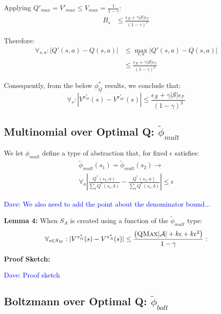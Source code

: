 \documentclass{article}
\newcommand{\ep}{\widetilde \phi}
\newcommand\dnote[1]{\textcolor{blue}{Dave: #1}}
\begin{document}
Applying $Q'_{max}=V'_{max} \leq V_{max}=\frac{1}{1-\gamma}$:
\begin{align*}
B_{s} &\leq 
\frac
{{\epsilon_{\mathcal{R}}} + \gamma |\mathcal{S}|\epsilon_{\mathcal{T}}}
{(1-\gamma)^2}
\end{align*}

Therefore:
\begin{align*}
\forall_{s,a} : |Q'(s,a) - Q(s,a)| &\leq \max_{s,a}|Q'(s,a)-Q(s,a)| \\
&\leq  \frac{{\epsilon_{\mathcal{R}}} + \gamma |\mathcal{S}|\epsilon_{\mathcal{T}} }{(1-\gamma)^2}
\end{align*}

Consequently, from the below $\phi_Q^*$ results, we conclude that:
\begin{equation}
\forall_s : |V^{\pi^*_M}(s) - V^{\pi^*_{M'}}(s)| \leq \frac{{\epsilon_{\mathcal{R}}} + \gamma |\mathcal{S}|\epsilon_{\mathcal{T}}}{(1-\gamma)^3}
\end{equation}


\subsection{Multinomial over Optimal Q: $\ep_{mult}$}

We let $\phi_{mult}$ define a type of abstraction that, for fixed $\epsilon$ satisfies:
\begin{multline}
\ep_{mult}(s_1) = \ep_{mult}(s_2) \rightarrow \\
\forall_{a} \left|\frac{Q^*(s_1,a)}{\sum_b Q^*(s_1,b)} - \frac{Q^*(s_1,a)}{\sum_b Q^*(s_1,b)}\right| \leq \epsilon
\end{multline}

\dnote{We also need to add the point about the denominator bound...}

{\bf Lemma 4:} When $S_A$ is created using a function of the $\ep_{mult}$ type:
\begin{equation}
\forall_{s \in S_M} : | V^{\pi^*_G}(s) - V^{\pi^*_{A}}(s) | \leq \frac{\left(\textsc{QMax}|\mathcal{A}| + k \epsilon + k \epsilon^2\right)}{1-\gamma}:
\end{equation}

{\bf Proof Sketch:}

\dnote{Proof sketch}


\subsection{Boltzmann over Optimal Q: $\ep_{bolt}$}
\end{document}
